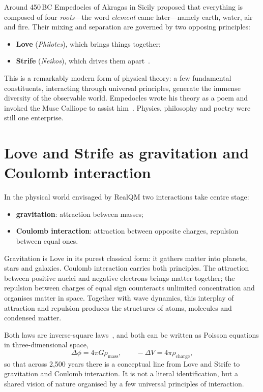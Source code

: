 Around 450\,BC Empedocles of Akragas in Sicily proposed that everything is composed of four
\emph{roots}---the word \emph{element} came later---namely earth, water, air and fire. Their mixing and
separation are governed by two opposing principles:
\begin{itemize}
\item \textbf{Love} (\emph{Philotes}), which brings things together;
\item \textbf{Strife} (\emph{Neikos}), which drives them apart~\cite{DK51,KRS83,Inwood01}.
\end{itemize}
This is a remarkably modern form of physical theory: a few fundamental constituents, interacting through
universal principles, generate the immense diversity of the observable world. Empedocles wrote his theory as
a poem and invoked the Muse Calliope to assist him~\cite{DK51}. Physics, philosophy and poetry were still one
enterprise.

\section{Love and Strife as gravitation and Coulomb interaction}\label{sec:love-strife}

In the physical world envisaged by RealQM two interactions take centre stage:
\begin{itemize}
\item \textbf{gravitation}: attraction between masses;
\item \textbf{Coulomb interaction}: attraction between opposite charges, repulsion between equal ones.
\end{itemize}
Gravitation is Love in its purest classical form: it gathers matter into planets, stars and galaxies.
Coulomb interaction carries both principles. The attraction between positive nuclei and negative electrons
brings matter together; the repulsion between charges of equal sign counteracts unlimited concentration and
organises matter in space. Together with wave dynamics, this interplay of attraction and repulsion produces
the structures of atoms, molecules and condensed matter.

Both laws are inverse-square laws~\cite{Newton1687,Coulomb1785}, and both can be written as Poisson
equations in three-dimensional space,
\begin{equation*}
\Delta\phi = 4\pi G\rho_{\mathrm{mass}}, \qquad -\Delta V = 4\pi\rho_{\mathrm{charge}},
\end{equation*}
so that across 2{,}500 years there is a conceptual line from Love and Strife to gravitation and Coulomb
interaction. It is not a literal identification, but a shared vision of nature organised by a few universal
principles of interaction.

